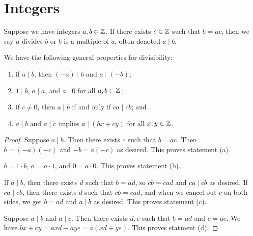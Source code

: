 \section{Integers}

\begin{definition}
    Suppose we have integers \(a,b \in \mathbb{Z}\).
    If there exists \(c \in \mathbb{Z}\) such that \(b = ac\),
    then we say \(a\) divides \(b\) or \(b\) is a multiple of \(a\),
    often denoted \(a \mid b\).
\end{definition}
\begin{proposition}\label{prop:divisibility-properties}
    We have the following general properties for divisibility:
    \begin{enumerate}[label={(\alph*)}, itemsep=0mm]
        \item if \(a \mid b\), then \((-a) \mid b\) and \(a \mid (-b)\);
        \item \(1 \mid b\), \(a \mid a\), and \(a \mid 0\) for all \(a,b \in \mathbb{Z}\);
        \item if \(c \neq 0\), then \(a \mid b\) if and only if \(ca \mid cb\); and
        \item \(a \mid b\) and \(a \mid c\) implies \(a \mid (bx+cy)\) for all \(x,y \in \mathbb{Z}\).
    \end{enumerate}
\end{proposition}
\begin{proof}
    Suppose \(a \mid b\). Then there exists \(c\) such that \(b = ac\).
    Then \(b = (-a)(-c)\) and \(-b = a(-c)\) as desired.
    This proves statement (a).

    \(b = 1 \cdot b\), \(a = a \cdot 1\), and \(0 = a \cdot 0\).
    This proves statement (b).

    If \(a \mid b\), then there exists \(d\) such that \(b = ad\),
    so \(cb = cad\) and \(ca \mid cb\) as desired.
    If \(ca \mid cb\), then there exists \(d\) such that \(cb = cad\),
    and when we cancel out \(c\) on both sides,
    we get \(b = ad\) and \(a \mid b\) as desired.
    This proves statement (c).

    Suppose \(a \mid b\) and \(a \mid c\).
    Then there exists \(d,e\) such that \(b = ad\) and \(c = ae\).
    We have \(bx+cy = axd + aye = a(xd + ye)\).
    This proves statment (d).
\end{proof}

